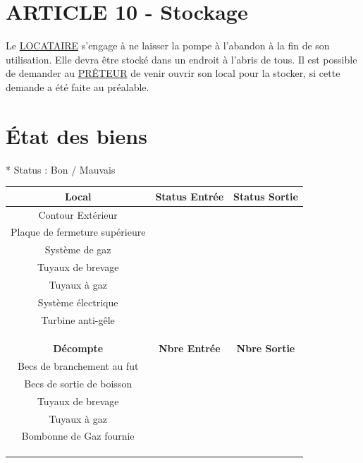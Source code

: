 \documentclass{article}
\begin{document}
\section*{ARTICLE 10 - Stockage}
Le \underline{LOCATAIRE} s’engage à ne laisser la pompe à l'abandon à la fin de son utilisation. Elle devra être stocké dans un endroit à l'abris de tous.
Il est possible de demander au \underline{PRÊTEUR} de venir ouvrir son local pour la stocker, si cette demande a été faite au préalable.

\newpage

\section*{État des biens}
\begin{center}
* Status : Bon / Mauvais
\end{center}
\begin{center}
\begin{tabular}{ |c|c|c| } 
 \hline
 \textbf{Local} & \textbf{Status Entrée} & \textbf{Status Sortie} \\
 \hline
 Contour Extérieur &  &  \\
 \hline
 Plaque de fermeture supérieure &  &  \\
 \hline
 Système de gaz &  &  \\
 \hline
 Tuyaux de brevage &  &  \\
 \hline
 Tuyaux à gaz &  &  \\
 \hline
 Système électrique &  &  \\
 \hline
 Turbine anti-gêle &  &  \\
 \hline
  &  &  \\
 \hline
  &  &  \\
 \hline
  &  &  \\
 \hline
 \textbf{Décompte} & \textbf{Nbre Entrée} & \textbf{Nbre Sortie} \\
 \hline
 Becs de branchement au fut &  &  \\
 \hline
 Becs de sortie de boisson &  &  \\
 \hline
 Tuyaux de brevage &  &  \\
 \hline
 Tuyaux à gaz &  &  \\
 \hline
 Bombonne de Gaz fournie &  &  \\
 \hline
  &  &  \\
 \hline
  &  &  \\
 \hline
  &  &  \\
 \hline
\end{tabular}
\end{center}
\end{document}
